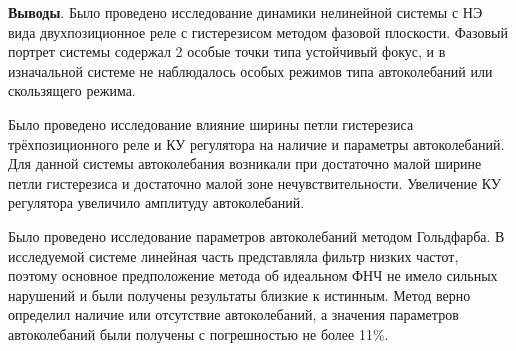 	\textbf{Выводы}. Было проведено исследование динамики нелинейной системы с НЭ вида двухпозиционное реле с гистерезисом методом фазовой плоскости. Фазовый портрет системы содержал 2 особые точки типа устойчивый фокус, и в изначальной системе не наблюдалось особых режимов типа автоколебаний или скользящего режима.
	
	Было проведено исследование влияние ширины петли гистерезиса трёхпозиционного реле и КУ регулятора на наличие и параметры автоколебаний. Для данной системы автоколебания возникали при достаточно малой ширине петли гистерезиса и достаточно малой зоне нечувствительности. Увеличение КУ регулятора увеличило амплитуду автоколебаний.
	
	Было проведено исследование параметров автоколебаний методом Гольдфарба. В исследуемой системе линейная часть представляла фильтр низких частот, поэтому основное предположение метода об идеальном ФНЧ не имело сильных нарушений и были получены результаты близкие к истинным. Метод верно определил наличие или отсутствие автоколебаний, а значения параметров автоколебаний были получены с погрешностью не более 11\%.
		
	


